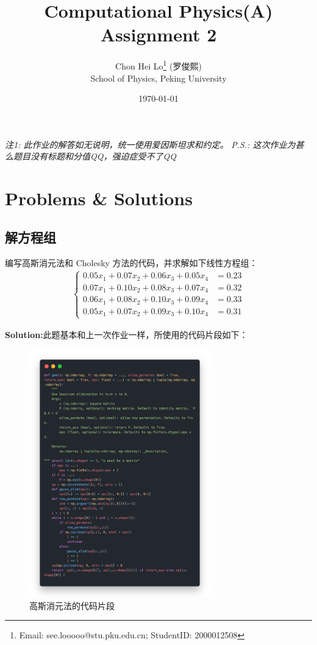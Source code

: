 \documentclass[12pt, a4paper, oneside]{article}
\title{\textbf{Computational Physics(A) \\Assignment 2}}
\author{Chon Hei Lo\thanks{Email: see.looooo@stu.pku.edu.cn; StudentID: 2000012508} (罗俊熙) \\ School of Physics, Peking University}
\date{\today}
\begin{document}
\maketitle

\begin{center}
\textit{注1: 此作业的解答如无说明，统一使用爱因斯坦求和约定。}
\textit{P.S.: 这次作业为甚么题目没有标题和分值QQ，强迫症受不了QQ}
\end{center}
\section{Problems \& Solutions}
\subsection{解方程组}
编写高斯消元法和 Cholesky 方法的代码，并求解如下线性方程组：
\begin{align*}
    \left\{
        \begin{array}{ccc}
        0.05x_1+0.07x_2+0.06x_3+0.05x_4 &= 0.23 \\
        0.07x_1+0.10x_2+0.08x_3+0.07x_4 &= 0.32 \\
        0.06x_1+0.08x_2+0.10x_3+0.09x_4 &= 0.33 \\
        0.05x_1+0.07x_2+0.09x_3+0.10x_4 &= 0.31
        \end{array}
    \right.
\end{align*}


\textbf{Solution:}此题基本和上一次作业一样，所使用的代码片段如下：
\begin{figure}
    \centering
    \includegraphics[width=0.7\textwidth]{fig1.png}
    \caption{高斯消元法的代码片段}
\end{figure}
\end{document}
